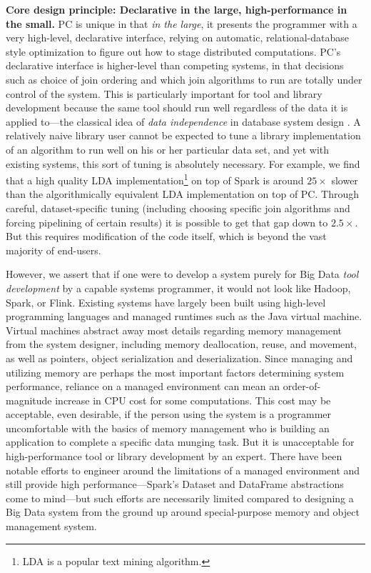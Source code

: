 \vspace{5 pt}
\noindent
\textbf{Core design principle: Declarative in the large, high-performance in the small.}
PC is unique in that \emph{in the large}, 
it presents the programmer with a very high-level,
declarative interface, relying on automatic, 
relational-database style optimization \cite{chaudhuri1998overview} to figure out how to stage
distributed computations.  
PC's declarative interface is higher-level than competing systems, in that decisions such as choice of join ordering and which
join algorithms to run are
totally under control of the system. 
This is particularly important for tool and library development because the same tool should run well regardless of the data
it is applied to---the classical idea of \emph{data independence} in database system design \cite{stonebraker1990third}.
A relatively naive library user cannot be expected to tune a library implementation of an algorithm to run
well on his or her particular data set, and yet with existing systems, this sort of tuning
is absolutely necessary.  For example, we find
that a high quality LDA implementation\footnote{LDA \cite{blei2003latent} is a popular text mining algorithm.}
on top of Spark is around $25\times$ slower than the algorithmically equivalent LDA
implementation on top of PC.  Through careful, dataset-specific tuning (including choosing specific join algorithms and
forcing pipelining of certain results) it is possible to get that gap down to $2.5\times$.  But this requires modification of the
code itself, which is beyond the vast majority of end-users.

However, we assert that if one were to develop a system purely for Big Data \emph{tool development} 
by a capable systems programmer,
it would not look like Hadoop, Spark, or Flink.
Existing systems have largely been built using high-level programming languages and managed runtimes such as the Java 
virtual machine.  Virtual machines abstract away
most details regarding memory management
from the system designer, including memory deallocation, reuse, and movement, as well as pointers,
object serialization and deserialization.
Since managing and utilizing memory are perhaps the most important factors determining system performance, reliance
on a managed environment can mean an order-of-magnitude increase in CPU cost for some computations.  
This cost may be acceptable, even desirable, if the person using the system
is a programmer uncomfortable with the basics of memory management who is
building an application to complete a specific data munging task.  But it is unacceptable for high-performance tool
or library development by an expert.
There have been notable efforts to engineer around the limitations of a managed environment and still provide
high performance---Spark's Dataset and
DataFrame abstractions come to mind---but such efforts are necessarily limited compared to
designing a Big Data system from the ground up around special-purpose
memory and object management system.

